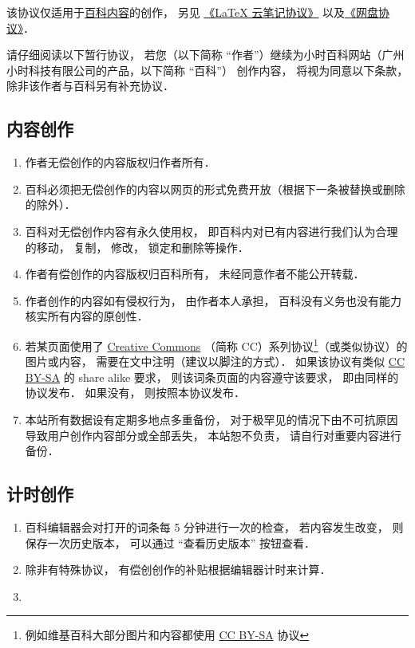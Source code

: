 
该协议仅适用于\href{https://wuli.wiki/online/}{百科内容}的创作， 另见 \href{https://wuli.wiki/online/NtLcns.html}{《LaTeX 云笔记协议》} 以及\href{http://www.example.com}{《网盘协议》}．

请仔细阅读以下暂行协议， 若您（以下简称 “作者”）继续为小时百科网站（广州小时科技有限公司的产品，以下简称 “百科”） 创作内容， 将视为同意以下条款， 除非该作者与百科另有补充协议．

\subsection{内容创作}
\begin{enumerate}
\item 作者无偿创作的内容版权归作者所有．
\item 百科必须把无偿创作的内容以网页的形式免费开放（根据下一条被替换或删除的除外）．
\item 百科对无偿创作内容有永久使用权， 即百科内对已有内容进行我们认为合理的移动， 复制， 修改， 锁定和删除等操作．
\item 作者有偿创作的内容版权归百科所有， 未经同意作者不能公开转载．
\item 作者创作的内容如有侵权行为， 由作者本人承担， 百科没有义务也没有能力核实所有内容的原创性．
\item 若某页面使用了 \href{https://creativecommons.org/licenses/}{Creative Commons} （简称 CC）系列协议\footnote{例如维基百科大部分图片和内容都使用 \href{https://creativecommons.org/licenses/by-sa/3.0/}{CC BY-SA} 协议}（或类似协议）的图片或内容， 需要在文中注明（建议以脚注的方式）． 如果该协议有类似 \href{https://creativecommons.org/licenses/by-sa/3.0/}{CC BY-SA} 的 share alike 要求， 则该词条页面的内容遵守该要求， 即由同样的协议发布． 如果没有， 则按照本协议发布．
\item 本站所有数据设有定期多地点多重备份， 对于极罕见的情况下由不可抗原因导致用户创作内容部分或全部丢失， 本站恕不负责， 请自行对重要内容进行备份．
\end{enumerate}

\subsection{计时创作}
\begin{enumerate}
\item 百科编辑器会对打开的词条每 5 分钟进行一次的检查， 若内容发生改变， 则保存一次历史版本， 可以通过 “查看历史版本” 按钮查看．
\item 除非有特殊协议， 有偿创创作的补贴根据编辑器计时来计算．
\item 
\end{enumerate}


